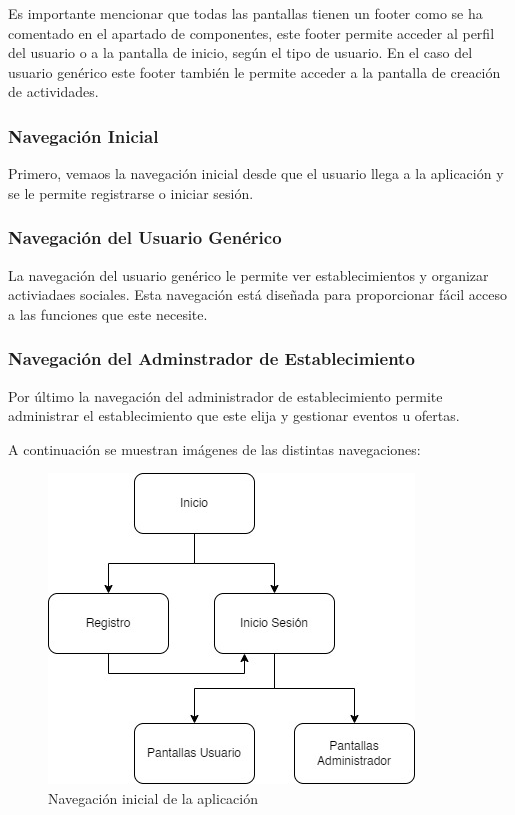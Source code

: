 Es importante mencionar que todas las pantallas tienen un footer como se ha comentado en el apartado de componentes, este footer permite acceder al perfil del usuario o a la pantalla de inicio, según el tipo de usuario. En el caso del usuario genérico  este footer también le permite acceder a la pantalla de creación de actividades.

\subsubsection{Navegación Inicial}

Primero, vemaos la navegación inicial desde que el usuario llega a la aplicación y se le permite registrarse o iniciar sesión.

\subsubsection{Navegación del Usuario Genérico}

La navegación del usuario genérico le permite ver establecimientos y organizar activiadaes sociales. Esta navegación está diseñada para proporcionar fácil acceso a las funciones que este necesite.

\subsubsection{Navegación del Adminstrador de Establecimiento}

Por último la navegación del administrador de establecimiento permite administrar el establecimiento que este elija y gestionar eventos u ofertas.

A continuación se muestran imágenes de las distintas navegaciones:

\clearpage
\begin{figure}[h]
    \centering
    \includegraphics[width=\linewidth]{imagenes/NavegacionPrincipal.jpg}
    \caption{Navegación inicial de la aplicación}
    \label{fig:mi_imagen}
\end{figure}

